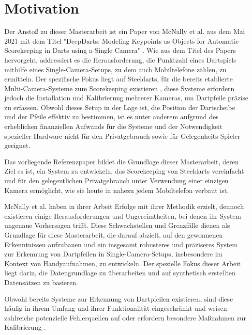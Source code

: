 \section{Motivation}
\label{sec:motivation}

Der Anstoß zu dieser Masterarbeit ist ein Paper von McNally et al. aus dem Mai 2021 mit dem Titel "DeepDarts: Modeling Keypoints as Objects for Automatic Scorekeeping in Darts using a Single Camera" \cite{deepdarts}. Wie aus dem Titel des Papers hervorgeht, addressiert es die Herausforderung, die Punktzahl eines Dartspiels mithilfe eines Single-Camera-Setups, zu dem auch Mobiltelefone zählen, zu ermitteln. Der spezifische Fokus liegt auf Steeldarts, für die bereits etablierte Multi-Camera-Systeme zum Scorekeeping existieren \cite{autodarts, scoliadarts}, diese Systeme erfordern jedoch die Installation und Kalibrierung mehrerer Kameras, um Dartpfeile präzise zu erfassen. Obwohl dieses Setup in der Lage ist, die Position der Dartscheibe und der Pfeile effektiv zu bestimmen, ist es unter anderem aufgrund des erheblichen finanziellen Aufwands für die Systeme und der Notwendigkeit spezieller Hardware nicht für den Privatgebrauch sowie für Gelegenheits-Spieler geeignet.

Das vorliegende Referenzpaper bildet die Grundlage dieser Masterarbeit, deren Ziel es ist, ein System zu entwickeln, das Scorekeeping von Steeldarts vereinfacht und für den gelegentlichen Privatgebrauch unter Verwendung einer einzigen Kamera ermöglicht, wie sie heute in nahezu jedem Mobiltelefon verbaut ist.

McNally et al. haben in ihrer Arbeit Erfolge mit ihrer Methodik erzielt, dennoch existieren einige Herausforderungen und Ungereimtheiten, bei denen ihr System ungenaue Vorhersagen trifft. Diese Schwachstellen und Grenzfälle dienen als Grundlage für diese Masterarbeit, die darauf abzielt, auf den gewonnenen Erkenntnissen aufzubauen und ein insgesamt robusteres und präziseres System zur Erkennung von Dartpfeilen in Single-Camera-Setups, insbesondere im Kontext von Handyaufnahmen, zu entwickeln. Der spezielle Fokus dieser Arbeit liegt darin, die Datengrundlage zu überarbeiten und auf synthetisch erstellten Datensätzen zu basieren.

Obwohl bereits Systeme zur Erkennung von Dartpfeilen existieren, sind diese häufig in ihrem Umfang und ihrer Funktionalität eingeschränkt und weisen zahlreiche potenzielle Fehlerquellen auf oder erfordern besondere Maßnahmen zur Kalibrierung \cite{darts_project, opencv_steel_darts, dartscore_repo}.

